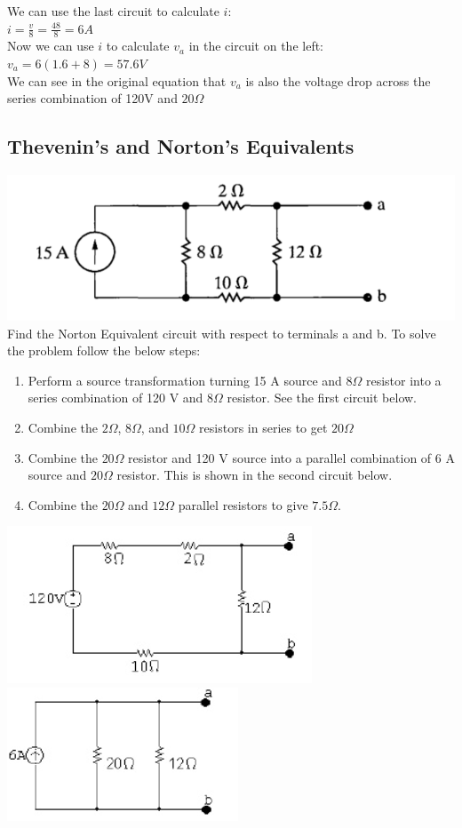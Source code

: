 We can use the last circuit to calculate $i$: \\
$ i = \frac{v}{8} = \frac{48}{8} = 6A $ \\

Now we can use $i$ to calculate $v_a$ in the circuit on the left:
\\$ v_a = 6(1.6 + 8) = 57.6 V $ \\
We can see in the original equation that $v_a$ is also the voltage drop across the series
combination of 120V and $20\Omega$

\subsection{Thevenin's and Norton's Equivalents}

\includegraphics[scale=0.5]{img/c4/p4} \\
Find the Norton Equivalent circuit with respect to terminals a and b.
To solve the problem follow the below steps:
\begin{enumerate}
	\item Perform a source transformation turning 15 A source and $8\Omega$ resistor into 
	a series combination of 120 V and $8\Omega$ resistor. See the first circuit below. 
	\item Combine the $2\Omega$, $8\Omega$, and $10\Omega$ resistors in series to get
	$20 \Omega$
	\item Combine the $20\Omega$ resistor and 120 V source into a parallel combination
	of 6 A source and $20\Omega$ resistor. This is shown in the second circuit below.
	\item Combine the $20\Omega$ and $12\Omega$ parallel resistors to give $7.5\Omega$.
\end{enumerate}

\includegraphics[scale=0.5]{img/c4/a41} \\
\includegraphics[scale=0.5]{img/c4/a42} \\

